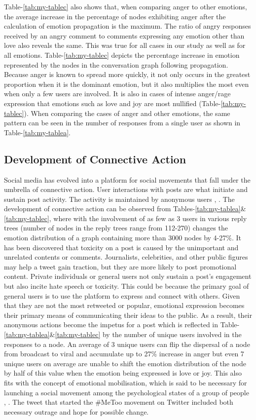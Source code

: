 \documentclass[acmtog]{acmart}
\begin{document}
Table-\ref{tab:my-tablec} also shows that, when comparing anger to other emotions, the average increase in the percentage of nodes exhibiting anger after the calculation of emotion propagation is the maximum. The ratio of angry responses received by an angry comment to comments expressing any emotion other than love also reveals the same. This was true for all cases in our study as well as for all emotions. Table-\ref{tab:my-tablec} depicts the percentage increase in emotion represented by the nodes in the conversation graph following propagation. Because anger is known to spread more quickly, it not only occurs in the greatest proportion when it is the dominant emotion, but it also multiplies the most even when only a few users are involved. It is also in cases of intense anger/rage expression that emotions such as love and joy are most nullified (Table-\ref{tab:my-tablec}). When comparing the cases of anger and other emotions, the same pattern can be seen in the number of responses from a single user as shown in Table-\ref{tab:my-tablea}. 
\subsection{Development of Connective Action}
Social media has evolved into a platform for social movements that fall under the umbrella of connective action. User interactions with posts are what initiate and sustain post activity. The activity is maintained by anonymous users \cite{mirbabaie2021development}, \cite{saveski2021structure}. The development of connective action can be observed from Tables-\ref{tab:my-tablea}\&\ref{tab:my-tablec}, where with the involvement of as few as 3 users in various reply trees (number of nodes in the reply trees range from 112-270) changes the emotion distribution of a graph containing more than 3000 nodes by 4-27\%. It has been discovered that toxicity on a post is caused by the unimportant and unrelated contents or comments. Journalists, celebrities, and other public figures may help a tweet gain traction, but they are more likely to post promotional content. Private individuals or general users not only sustain a post's engagement but also incite hate speech or toxicity. This could be because the primary goal of general users is to use the platform to express and connect with others. Given that they are not the most retweeted or popular, emotional expression becomes their primary means of communicating their ideas to the public. As a result, their anonymous actions become the impetus for a post which is reflected in Table-\ref{tab:my-tablea}\&\ref{tab:my-tablec} by the number of unique users involved in the responses to a node. An average of 3 unique users can flip the dispersal of a node from broadcast to viral and accumulate up to 27\% increase in anger but even 7 unique users on average are unable to shift the emotion distribution of the node by half of this value when the emotion being expressed is love or joy. This also fits with the concept of emotional mobilisation, which is said to be necessary for launching a social movement among the psychological states of a group of people \cite{castells2015networks}, \cite{saveski2021structure}. The tweet that started the \#MeToo movement on Twitter included both necessary outrage and hope for possible change.
\end{document}
